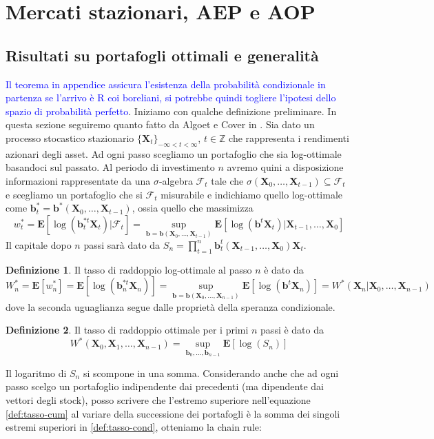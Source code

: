 \documentclass[a4paper,11pt]{book}
\theoremstyle{plain}
\theoremstyle{definition}
\newtheorem{defn}{Definizione}[chapter]
\theoremstyle{remark}
\newcommand{\Z}{\mathbb{Z}}
\newcommand{\X}{\bm{X}}
\newcommand{\B}{\bm{b}}
\newcommand{\F}{\mathcal{F}}
\newcommand{\E}{\mathbf{E}}
\begin{document}
\section{Mercati stazionari, AEP e AOP}
\subsection{Risultati su portafogli ottimali e generalità}
\textcolor{blue}{Il teorema in appendice assicura l'esistenza della probabilità condizionale in partenza se l'arrivo è R coi boreliani, si potrebbe quindi togliere l'ipotesi dello spazio di probabilità perfetto}.\newline
Iniziamo con qualche definizione preliminare. In questa sezione seguiremo quanto fatto da Algoet e Cover in \cite{algoet1988}. Sia dato un processo stocastico stazionario $\{\X_t\}_{-\infty<t<\infty}$, $t\in \Z$ che rappresenta i rendimenti azionari degli asset. Ad ogni passo scegliamo un portafoglio che sia log-ottimale basandoci sul passato. Al periodo di investimento $n$ avremo quini a disposizione informazioni rappresentate da una $\sigma$-algebra $\F_t$ tale che $\sigma(\X_0,\ldots,\X_{t-1})\subseteq \F_t$ e scegliamo un portafoglio che si $\F_t$ misurabile e indichiamo quello log-ottimale come $\B_t^*=\B^*(\X_0,\ldots,\X_{t-1})$, ossia quello che massimizza
\begin{equation*}
	w_t^*=\E[\log(\B_t^{*t}\X_t)|\F_t] = \sup\limits_{\bm{b}=\B(\X_0,\ldots, \X_{t-1})}\E[\log(\B^t\X_t)|\X_{t-1},\ldots,\X_0]
\end{equation*}
Il capitale dopo $n$ passi sarà dato da $S_n=\prod_{t = 1}^{n}{\B_t^{t}(\X_{t-1},\ldots,\X_0)\X_t}$.
\begin{defn}
	Il tasso di raddoppio log-ottimale al passo $n$ è dato da
	\begin{equation}\label{def:tasso-cond}
		W^*_n=\E[w_n^*] = \E[\log(\B_n^{*t}\X_n)] = \sup\limits_{\bm{b}=\B(\X_0,\ldots, \X_{n-1})}\E[\log(\B^t\X_n)]=W^*(\X_n|\X_0,\ldots,\X_{n-1})
	\end{equation}
	dove la seconda uguaglianza segue dalle proprietà della speranza condizionale.
\end{defn}
\begin{defn}
	Il tasso di raddoppio ottimale per i primi $n$ passi è dato da
	\begin{equation}\label{def:tasso-cum}
		W^*(\X_0,\X_1,\ldots,\X_{n-1}) = \sup\limits_{\B_0,\ldots, \B_{n-1}}\E[\log(S_n)]
	\end{equation}
\end{defn}
Il logaritmo di $S_n$ si scompone in una somma. Considerando anche che ad ogni passo scelgo un portafoglio indipendente dai precedenti (ma dipendente dai vettori degli stock), posso scrivere che l'estremo superiore nell'equazione \ref{def:tasso-cum} al variare della successione dei portafogli è la somma dei singoli estremi superiori in \ref{def:tasso-cond}, otteniamo la chain rule:
\end{document}
